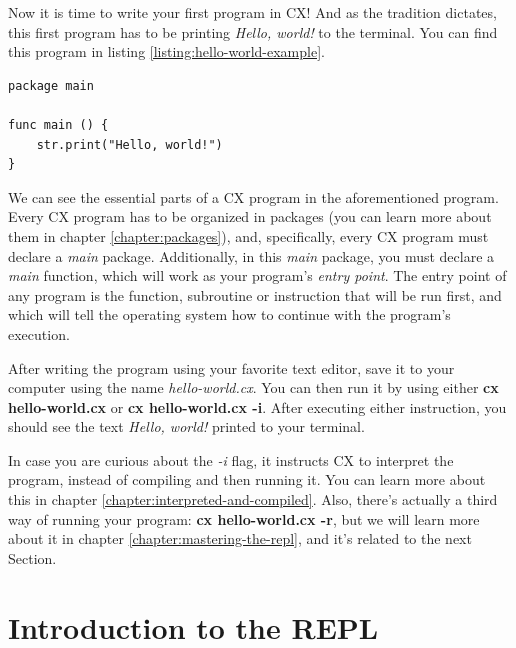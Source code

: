 \documentclass[11pt,fleqn,openany]{book} %
\begin{document}
Now it is time to write your first program in CX! And as the tradition dictates, this first program has to be printing \emph{Hello, world!} to the terminal. You can find this program in listing \ref{listing:hello-world-example}.

\begin{lstlisting}[caption={"Hello, world!" example},captionpos=b,label={listing:hello-world-example}]
package main

func main () {
 	str.print("Hello, world!")
}
\end{lstlisting}

We can see the essential parts of a CX program in the aforementioned program. Every CX program has to be organized in packages (you can learn more about them in chapter \ref{chapter:packages}), and, specifically, every CX program must declare a \emph{main} package. Additionally, in this \emph{main} package, you must declare a \emph{main} function, which will work as your program's \emph{entry point}. The entry point of any program is the function, subroutine or instruction that will be run first, and which will tell the operating system how to continue with the program's execution.

After writing the program using your favorite text editor, save it to your computer using the name \emph{hello-world.cx}. You can then run it by using either \textbf{cx hello-world.cx} or \textbf{cx hello-world.cx -i}. After executing either instruction, you should see the text \textit{Hello, world!} printed to your terminal.

In case you are curious about the \emph{-i} flag, it instructs CX to interpret the program, instead of compiling and then running it. You can learn more about this in chapter \ref{chapter:interpreted-and-compiled}. Also, there's actually a third way of running your program: \textbf{cx hello-world.cx -r}, but we will learn more about it in chapter \ref{chapter:mastering-the-repl}, and it's related to the next Section.

\section{Introduction to the REPL}
\label{section:introduction-to-the-repl}
\end{document}
